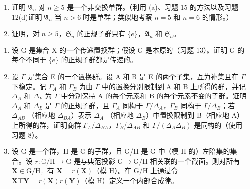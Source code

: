 \begin{enumerate}
\def\labelenumi{(\alph{enumi})}
\setcounter{enumi}{1}
\item
  证明 \(\mathfrak{A}_n\) 对 \(n \geqslant 5\) 是一个非交换单群。（利用 (a)、习题 15 的方法以及习题 12(d)证明 \(\mathfrak{A}_n\) 当 \(n > 6\) 时是单群；类似地考察 \(n = 5\) 和 \(n = 6\) 的情形。）
\item
  证明，对 \(n \geqslant 5\)，\(\mathfrak{S}_n\) 的正规子群只有 \(\{e\}\)，\(\mathfrak{A}_n\) 和 \(\mathfrak{S}_n\)。
\end{enumerate}

\begin{enumerate}
\def\labelenumi{\arabic{enumi}。}
\setcounter{enumi}{16}
\item
  设 G 是集合 X 的一个传递置换群；假设 G 是本原的（习题 13）。证明 G 的每个不同于 \(\{e\}\) 的正规子群都是传递的。
\item
  设 \(\Gamma\) 是集合 E 的一个置换群。设 A 和 B 是 E 的两个子集，互为补集且在 \(\Gamma\) 下稳定。记 \(\Gamma_{A}\) 和 \(\Gamma_{B}\) 为由 \(\Gamma\) 中的置换分别限制到 A 和 B 上所得的群，并记 \(\Delta_{A}\) 和 \(\Delta_{B}\) 为 \(\Gamma\) 中分别保持 A 的每个元素和 B 的每个元素不变的子群。证明 \(\Delta_{A}\) 和 \(\Delta_{B}\) 是 \(\Gamma\) 的正规子群，且 \(\Gamma_{A}\) 同构于 \(\Gamma/\Delta_{A}\)，\(\Gamma_{B}\) 同构于 \(\Gamma/\Delta_{B}\)；若 \(\Delta_{AB}\) （相应地 \(\Delta_{BA}\)）表示 \(\Delta_{A}\) （相应地 \(\Delta_{B}\)）中置换限制到 B（相应地 A）上所得的群，证明商群 \(\Gamma_{A}/\Delta_{BA}\)，\(\Gamma_{B}/\Delta_{AB}\) 和 \(\Gamma/(\Delta_{A}\Delta_{B})\) 是同构的（使用习题 8）。
\item
  设 G 是一个群，H 是 G 的子群，且 G/H 是 G 中（模 H 的）左陪集的集合。设 \(r: \mathrm{G} / \mathrm{H} \to \mathrm{G}\) 是与典范投影 \(\mathrm{G} \to \mathrm{G} / \mathrm{H}\) 相关联的一个截面。则对所有 \(\mathbf{X} \in \mathrm{G} / \mathrm{H}\)，有 \(\mathbf{X} = r(\mathbf{X})\)（模 H）。在 G/H 上通过令 \(\mathbf{X} \top \mathbf{Y} = r(\mathbf{X})r(\mathbf{Y})\)（模 H）定义一个内部合成律。
\end{enumerate}

